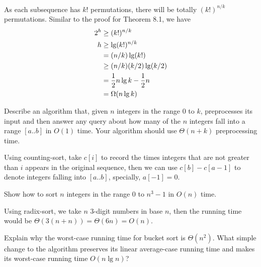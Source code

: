 \documentclass[12pt, a4paper, UTF8]{ctexart}
\begin{document}
\begin{solution}
  As each subsequence has $k!$ permutations, there will be totally $(k!)^{n/k}$ 
  permutations. Similar to the proof for Theorem 8.1, we have
  \begin{align}
    2^{h} & \geq (k!)^{n/k} \notag \\
    h     & \geq \lg(k!)^{n/k} \notag \\
          & = (n/k)\lg(k!) \notag \\
          & \geq (n/k)(k/2)\lg(k/2) \notag \\
          & = \frac{1}{2}n\lg k - \frac{1}{2} n \notag \\
          & = \Omega(n\lg k) \notag
  \end{align}
\end{solution}

\begin{problem}[TC: 8.2-4]
  Describe an algorithm that, given $n$ integers in the range 0 to $k$, 
  preprocesses its input and then answer any query about how many of  
  the $n$ integers fall into a range $[a..b]$ in $O(1)$ time. Your algorithm 
  should use $\Theta(n + k)$ preprocessing time.
\end{problem}

\begin{solution}
  Using counting-sort, take $c[i]$ to record the times integers that 
  are not greater than $i$ appears in the original sequence, then we 
  can use $c[b] - c[a-1]$ to denote integers falling into $[a..b]$, 
  specially, $a[-1] = 0$.
\end{solution}

\begin{problem}[TC: 8.3-4]
  Show how to sort $n$ integers in the range 0 to $n^{3} - 1$ in $O(n)$ 
  time.
\end{problem}

\begin{solution}
  Using radix-sort, we take $n$ 3-digit numbers in base $n$, then the 
  running time would be $\Theta(3(n+n)) = \Theta(6n) = O(n)$.
\end{solution}

\begin{problem}[TC: 8.4-2]
  Explain why the worst-case running time for bucket sort is $\Theta(n^{2})$. 
  What simple change to the algorithm preserves its linear average-case 
  running time and makes its worst-case running time $O(n\lg n)$?
\end{problem}
\end{document}
